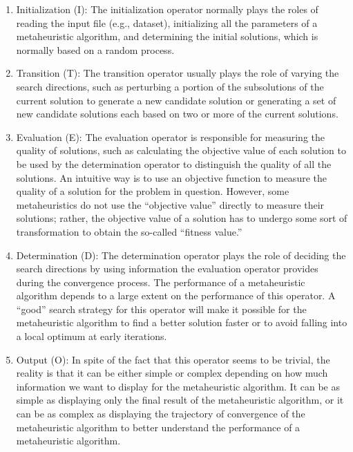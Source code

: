 \documentclass[
  letterpaper,
  DIV=11,
  numbers=noendperiod]{scrreprt}
\providecommand{\tightlist}{%
  \setlength{\itemsep}{0pt}\setlength{\parskip}{0pt}}\usepackage{longtable,booktabs,array}
\begin{document}
\begin{enumerate}
\def\labelenumi{\arabic{enumi}.}
\tightlist
\item
  Initialization (I): The initialization operator normally plays the
  roles of reading the input file (e.g., dataset), initializing all the
  parameters of a metaheuristic algorithm, and determining the initial
  solutions, which is normally based on a random process.
\item
  Transition (T): The transition operator usually plays the role of
  varying the search directions, such as perturbing a portion of the
  subsolutions of the current solution to generate a new candidate
  solution or generating a set of new candidate solutions each based on
  two or more of the current solutions.
\item
  Evaluation (E): The evaluation operator is responsible for measuring
  the quality of solutions, such as calculating the objective value of
  each solution to be used by the determination operator to distinguish
  the quality of all the solutions. An intuitive way is to use an
  objective function to measure the quality of a solution for the
  problem in question. However, some metaheuristics do not use the
  ``objective value'' directly to measure their solutions; rather, the
  objective value of a solution has to undergo some sort of
  transformation to obtain the so-called ``fitness value.''
\item
  Determination (D): The determination operator plays the role of
  deciding the search directions by using information the evaluation
  operator provides during the convergence process. The performance of a
  metaheuristic algorithm depends to a large extent on the performance
  of this operator. A ``good'' search strategy for this operator will
  make it possible for the metaheuristic algorithm to find a better
  solution faster or to avoid falling into a local optimum at early
  iterations.
\item
  Output (O): In spite of the fact that this operator seems to be
  trivial, the reality is that it can be either simple or complex
  depending on how much information we want to display for the
  metaheuristic algorithm. It can be as simple as displaying only the
  final result of the metaheuristic algorithm, or it can be as complex
  as displaying the trajectory of convergence of the metaheuristic
  algorithm to better understand the performance of a metaheuristic
  algorithm.
\end{enumerate}
\end{document}
